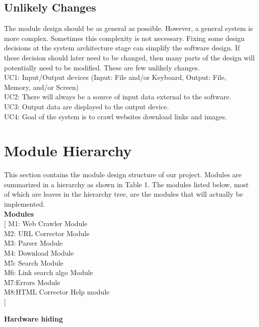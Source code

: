 \documentclass[titlepage]{article}
\newcommand{\group}[1]{{\leavevmode\color{red}[#1]}}
\begin{document}
\subsection{Unlikely Changes}
The module design should be as general as possible. However, a general system is more complex. Sometimes this complexity is not necessary. Fixing some design decisions at the system architecture stage can simplify the software design. If these decision should later need to be changed, then many parts of the design will potentially need to be modified.
These are few unlikely changes.\\

\noindent
UC1: Input/Output devices (Input: File and/or Keyboard, Output: File, Memory, and/or
Screen)\\
UC2: There will always be a source of input data external to the software.\\
UC3: Output data are displayed to the output device.\\
UC4: Goal of the system is to crawl websites download links and images.\\

\section{Module Hierarchy}
This section contains the module design structure of our project. Modules are summarized in a hierarchy as shown in Table 1. The modules listed below, most of which are leaves in the hierarchy tree, are the modules that will actually be implemented.
\\

\textbf{Modules}\\

\noindent
\group{
M1: Web Crawler Module\\
M2: URL Corrector Module\\
M3: Parser Module\\
M4: Download Module\\
M5: Search Module\\
M6: Link search algo Module\\
M7:Errors Module\\
M8:HTML Corrector Help module\\
}



\textbf{Hardware hiding}\\
\end{document}
